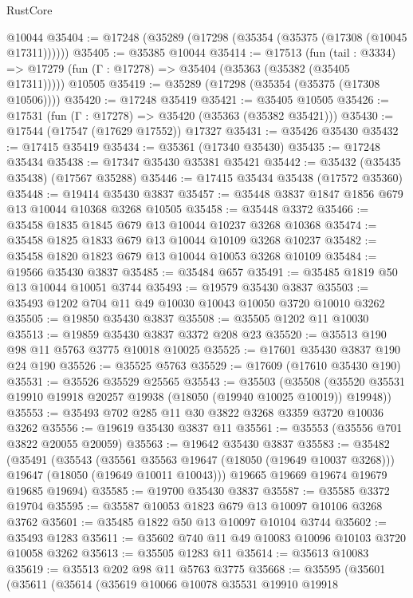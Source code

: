 \begin{lexlean}{RustCore}
\begin{coremodule}
    @10044
@35404 := @17248 (@35289 (@17298 (@35354 (@35375 (@17308 (@10045 @17311))))))
@35405 := @35385 @10044
@35414 := @17513
    (fun (tail : @3334) => @17279 (fun (Γ : @17278) => @35404 (@35363 (@35382 (@35405 @17311)))))
    @10505
@35419 := @35289 (@17298 (@35354 (@35375 (@17308 @10506))))
@35420 := @17248 @35419
@35421 := @35405 @10505
@35426 := @17531 (fun (Γ : @17278) => @35420 (@35363 (@35382 @35421)))
@35430 := @17544 (@17547 (@17629 @17552)) @17327
@35431 := @35426 @35430
@35432 := @17415 @35419
@35434 := @35361 (@17340 @35430)
@35435 := @17248 @35434
@35438 := @17347 @35430 @35381 @35421
@35442 := @35432 (@35435 @35438) (@17567 @35288)
@35446 := @17415 @35434 @35438 (@17572 @35360)
@35448 := @19414 @35430 @3837
@35457 := @35448 @3837 @1847 @1856 @679 @13 @10044 @10368 @3268 @10505
@35458 := @35448 @3372
@35466 := @35458 @1835 @1845 @679 @13 @10044 @10237 @3268 @10368
@35474 := @35458 @1825 @1833 @679 @13 @10044 @10109 @3268 @10237
@35482 := @35458 @1820 @1823 @679 @13 @10044 @10053 @3268 @10109
@35484 := @19566 @35430 @3837
@35485 := @35484 @657
@35491 := @35485 @1819 @50 @13 @10044 @10051 @3744
@35493 := @19579 @35430 @3837
@35503 := @35493 @1202 @704 @11 @49 @10030 @10043 @10050 @3720 @10010 @3262
@35505 := @19850 @35430 @3837
@35508 := @35505 @1202 @11 @10030
@35513 := @19859 @35430 @3837 @3372 @208 @23
@35520 := @35513 @190 @98 @11 @5763 @3775 @10018 @10025
@35525 := @17601 @35430 @3837 @190 @24 @190
@35526 := @35525 @5763
@35529 := @17609 (@17610 @35430 @190)
@35531 := @35526 @35529 @25565
@35543 := @35503
    (@35508 (@35520 @35531 @19910 @19918 @20257 @19938 (@18050 (@19940 @10025 @10019)) @19948))
@35553 := @35493 @702 @285 @11 @30 @3822 @3268 @3359 @3720 @10036 @3262
@35556 := @19619 @35430 @3837 @11
@35561 := @35553 (@35556 @701 @3822 @20055 @20059)
@35563 := @19642 @35430 @3837
@35583 := @35482
    (@35491
      (@35543
        (@35561 @35563 @19647 (@18050 (@19649 @10037 @3268)))
        @19647
        (@18050 (@19649 @10011 @10043)))
      @19665
      @19669
      @19674
      @19679
      @19685
      @19694)
@35585 := @19700 @35430 @3837
@35587 := @35585 @3372 @19704
@35595 := @35587 @10053 @1823 @679 @13 @10097 @10106 @3268 @3762
@35601 := @35485 @1822 @50 @13 @10097 @10104 @3744
@35602 := @35493 @1283
@35611 := @35602 @740 @11 @49 @10083 @10096 @10103 @3720 @10058 @3262
@35613 := @35505 @1283 @11
@35614 := @35613 @10083
@35619 := @35513 @202 @98 @11 @5763 @3775
@35668 := @35595
    (@35601
      (@35611
        (@35614
          (@35619
            @10066
            @10078
            @35531
            @19910
            @19918

\end{coremodule}
\end{lexlean}
